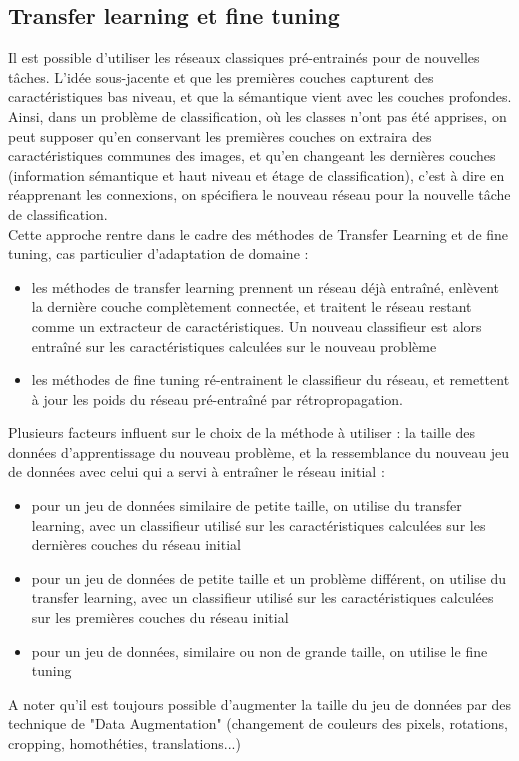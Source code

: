 \documentclass{DocBleu}
\begin{document}
\subsection{Transfer learning et fine tuning}
Il est possible d'utiliser les réseaux classiques pré-entrainés pour de nouvelles tâches. L'idée sous-jacente et que les premières couches capturent des caractéristiques bas niveau, et que la sémantique vient avec les couches profondes. Ainsi, dans un problème de classification, où les classes n'ont pas été apprises, on peut supposer qu'en conservant les premières couches on extraira des caractéristiques communes des images, et qu'en changeant les dernières couches (information sémantique et haut niveau et étage de classification), c'est à dire en réapprenant les connexions, on spécifiera le nouveau réseau pour la nouvelle tâche de classification.\\
Cette approche rentre dans le cadre des méthodes de Transfer Learning \cite{Pan10} et de fine tuning, cas particulier d'adaptation de domaine :
\begin{itemize}
\item les méthodes de transfer learning prennent un réseau déjà entraîné, enlèvent la dernière couche complètement connectée, et traitent le réseau restant comme un extracteur de caractéristiques. Un nouveau classifieur est alors entraîné sur les caractéristiques calculées sur le nouveau problème
\item les méthodes de fine tuning ré-entrainent le classifieur du réseau, et remettent à jour les poids du réseau pré-entraîné par rétropropagation.
\end{itemize}
Plusieurs facteurs influent sur le choix de la méthode à utiliser : la taille des données d'apprentissage du nouveau problème, et la ressemblance du nouveau jeu de données avec celui qui a servi à entraîner le réseau initial : 
\begin{itemize}
\item pour un jeu de données similaire de petite taille, on utilise du transfer learning, avec un classifieur utilisé sur les caractéristiques calculées sur les dernières couches du réseau initial
\item pour un jeu de données  de petite taille et un problème différent, on utilise du transfer learning, avec un classifieur utilisé sur les caractéristiques calculées sur les premières couches du réseau initial
\item pour un jeu de données, similaire ou non de grande taille, on utilise le fine tuning
\end{itemize}
A noter qu'il est toujours possible d'augmenter la taille du jeu de données par des technique de "Data Augmentation" (changement de couleurs des pixels, rotations, cropping, homothéties, translations...)
\end{document}
